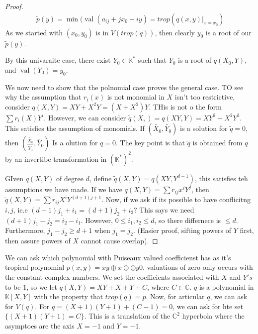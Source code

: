 \documentclass[12pt]{memoir}
\DeclareMathOperator{\val}{val}
\theoremstyle{definition}
\def\KK{{\mathbb K}}
\def\CC{{\mathbb C}}
\begin{document}
\begin{proof}
    \begin{align*}
        \tilde{p}(y) = \min(\val(a_{ij} + jx_0 + iy)= trop(q(x,y)|_{x=x_0})
    \end{align*}
    As we started with $(x_0,y_0)$ is in $V(trop(q))$, then clearly $y_0$ is a root of our $\tilde{p}(y)$.


    By this univaraite case, there exist $Y_0 \in \KK^*$ such that $Y_0$ is a root of $q(X_0,Y)$, and $\val(Y_0)=y_0$.

    We now need to show that the polnomial case proves the general case. TO see why the assumption that $r_i(x)$ is not monomial in $X$ isn't too restrictive, consider $q(X,Y) = XY +X^2Y=(X+X^2)Y$. THis is not o the form $\sum r_i(X)Y^i$. However, we can consider $\tilde{q}(X,)=q(XY,Y)=XY^2+X^2Y^3$. This satisfies the assumption of monomials. If $(\tilde{X_0},\tilde{Y_0})$ is a solution for $\tilde{q}=0$, then  $\left(\frac{\tilde{X_0}}{\tilde{Y_0} },\tilde{Y_0}  \right)$ Is a olution for $q=0$. The key point is that $\tilde{q}$ is obtained from $q$ by an invertibe transformation in $(\KK^*)^2$.




    GIven $q(X,Y)$ of degree $d$, define $\tilde{q}(X,Y) = q(XY, Y^{d-1})$, this satisfies teh assumptions we have made. If we have $q(X,Y) = \sum r_{ij} x^iY^j$, then $\tilde{q}(X,Y) = \sum r_{ij}X^iY^{(d+1)j+1}$. Now, if we ask if its possible to have conflicitng $i,j$, ie.e $(d+1)j_1+i_1=(d+1)j_2+i_2$? This says we need $(d+1)j_1-j_2=i_2-i_1$. However, $0\leq i_1,i_2 \leq d$, so there differnece is $\leq d$. Furthermore, $j_1-j_2 \geq d+1$ when $j_1=j_2$. (Easier proof, sifting powers of $Y$ first, then assure powers of $X$ cannot cause overlap).



    
\end{proof}

We can ask which polynomial with Puiseaux valued coefficienst has as it's tropical polynomial $p(x,y)=xy\oplus x \oplus \oplus y 0$. valuations of zero only occurs with the constant complex numbers. We set the coefficients associated with $X$ and $Y's$ to be $1$, so we let $q(X,Y)= XY+X+Y+C$, where $C \in \CC$. $q$ is a polynomial in $\KK[X,Y]$ with the property that $trop(q) = p$. Now, for articular $q$, we can ask for $V(q)$. For $q=(X+1)(Y+1)+(C-1)=0$, we can ask for hte set $\{(X+1)(Y+1) = C\}$. This is a translation of the $\CC^2$ hyperbola where the asymptoes are the axis $X=-1$ and $Y=-1$.
\end{document}
